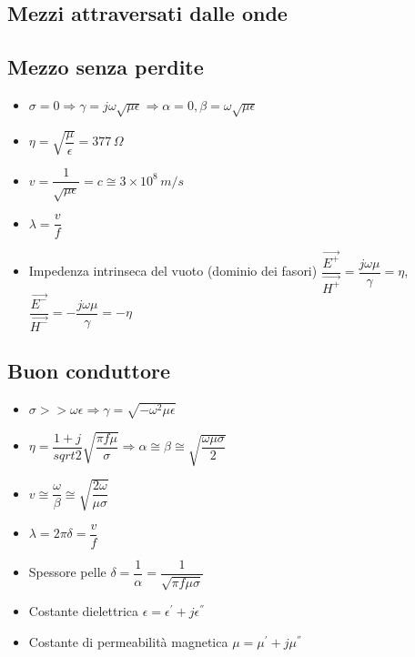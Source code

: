 \documentclass{article}
\begin{document}
\subsection{Mezzi attraversati dalle onde}
\subsection{Mezzo senza perdite}
\begin{itemize}
	\item \( \sigma = 0 \Rightarrow \gamma = j \omega \sqrt{\mu \epsilon} \Rightarrow \alpha = 0, \beta = \omega \sqrt{\mu \epsilon} \) 
	\item \( \eta = \sqrt{\dfrac{\mu}{\epsilon}}  = 377 \, \Omega \)
	\item \( v = \dfrac{1}{\sqrt{\mu \epsilon}} = c \cong 3\times10^8 \, m/s \)
	\item \( \lambda = \dfrac{v}{f} \)
	\item Impedenza intrinseca del vuoto (dominio dei fasori) \( \dfrac{\vec{E^+}}{\vec{H^+}} = \dfrac{j \omega \mu}{\gamma} = \eta \), \(\dfrac{\vec{E^-}}{\vec{H^-}} = - \dfrac{j \omega \mu}{\gamma} = - \eta\) 
\end{itemize}

\subsection{Buon conduttore}
\begin{itemize}
	\item \( \sigma >> \omega \epsilon \Rightarrow \gamma = \sqrt{-\omega^2 \mu \epsilon} \)
	\item \( \eta = \dfrac{1+j}{sqrt{2}} \sqrt{\dfrac{\pi f \mu}{\sigma}} \Rightarrow \alpha \cong \beta
	\cong \sqrt{\dfrac{\omega \mu \sigma}{2}} \)
	\item \( v \cong \dfrac{\omega}{\beta} \cong \sqrt{\dfrac{2 \omega}{\mu \sigma}} \)
	\item \( \lambda = 2 \pi \delta = \dfrac{v}{f} \)
	\item Spessore pelle \( \delta = \dfrac{1}{\alpha} = \dfrac{1}{\sqrt{\pi f \mu \sigma}} \)
	\item Costante dielettrica \( \epsilon = \epsilon ^ { ' } + j \epsilon ^ { '' } \)
	\item Costante di permeabilità magnetica \( \mu = \mu ^ { ' } + j \mu ^ { '' } \)
\end{itemize}
\end{document}
